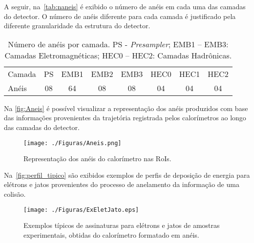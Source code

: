 A seguir, na~\autoref{tab:naneis} é exibido o número de anéis em cada uma das camadas do detector. O número de anéis diferente para cada camada é justificado pela diferente granularidade da estrutura do detector.

\begin{table}[H]
	\small{
	\begin{center}{
			\caption{Número de anéis por camada. PS - \textit{Presampler}; EMB1 -- EMB3: Camadas Eletromagnéticas; HEC0 -- HEC2: Camadas Hadrônicas.}
			\label{tab:naneis}
			\begin{tabular}{l*{7}{c}} \toprule
				Camada  & PS & EMB1 & EMB2 & EMB3 & HEC0 & HEC1 & HEC2 \\ \cmidrule(lr){1-1}\cmidrule(lr){2-8}%
				Anéis   & 08 & 64 & 08 & 08 & 04 & 04 & 04 \\ \bottomrule
		\end{tabular}}%
	\end{center}}
\end{table}

Na \autoref{fig:Aneis} é possível visualizar a representação dos anéis produzidos com base das informações provenientes da trajetória registrada pelos calorímetros ao longo das camadas do detector.

\begin{figure}[H]
	\begin{center}         
		\caption{Representação dos anéis do calorímetro nas RoIs.}
		\texttt{[image: ./Figuras/Aneis.png]}
		\label{fig:Aneis}
	\end{center}
\end{figure}

Na~\autoref{fig:perfil_tipico} são exibidos exemplos de perfis de deposição de energia para elétrons e jatos provenientes do processo de anelamento da informação de uma colisão.

\begin{figure}[H]
	\begin{center}         
		\caption{Exemplos típicos de assinaturas para elétrons e jatos de amostras experimentais, obtidas do calorímetro formatado em anéis.}
		\texttt{[image: ./Figuras/ExEletJato.eps]}
		\label{fig:perfil_tipico}
	\end{center}
\end{figure}

